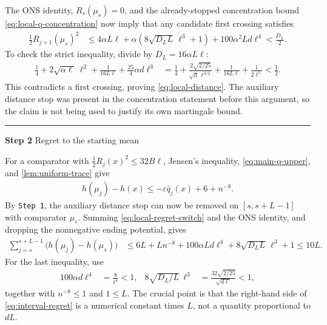 \documentclass{article}
\newcommand{\proofstep}[2]{%
    \par\medskip
    \noindent
    \textcolor{blue!55!black}{\rule{2pt}{1.2em}}%
    \hspace{0.6em}%
    {\sffamily\bfseries\color{blue!55!black}Step #1}%
    \quad
    {\sffamily #2}%
    \par\smallskip
}
\newcommand{\1}{\mathbf 1}
\newcommand{\eps}{\varepsilon}
\begin{document}
The ONS identity, $R_s(\mu_s)=0$, and the already-stopped concentration
bound \eqref{eq:local-q-concentration} now imply that any candidate first
crossing satisfies
\begin{align}
    \frac12R_{j+1}(\mu_s)^2
     & \leq4\alpha L\ell
    +\alpha\left(8\sqrt{D_LL}\,\ell^3+1\right)
    +100\alpha^2Ld\ell^4
    <\frac{D_L}{2}.
    \label{eq:local-distance-bootstrap}
\end{align}
To check the strict inequality, divide by $D_L=16\alpha L\ell$:
\begin{align}
    \frac14
    +2\sqrt{\alpha \ell}\,\ell^2
    +\frac{1}{16L\ell}
    +\frac{25}{4}\alpha d\ell^3
     & =\frac14
    +\frac{2\sqrt{2/25}}{\sqrt d\,\ell^{3/2}}
    +\frac{1}{16L\ell}
    +\frac{1}{2\ell^5}
    <\frac12.
\end{align}
This contradicts a first crossing, proving \eqref{eq:local-distance}.
The auxiliary distance stop was present in the concentration statement
before this argument, so the claim is not being used to justify its own
martingale bound.

\proofstep{2}{Regret to the starting mean}
For a comparator with $\frac12R_j(x)^2\leq32B\ell$, Jensen's inequality,
\eqref{eq:main-q-upper}, and \cref{lem:uniform-trace} give
\begin{align}
    h(\mu_j)-h(x)
    \leq-\eps \bar{q}_j(x)+6+n^{-8}.
    \label{eq:local-regret-switch}
\end{align}
By \texttt{Step 1}, the auxiliary distance stop can now be removed on
$[s,s+L-1]$ with comparator $\mu_s$. Summing
\eqref{eq:local-regret-switch} and the ONS identity, and dropping the
nonnegative ending potential, gives
\begin{align}
    \sum_{j=s}^{s+L-1}\bigl(h(\mu_j)-h(\mu_s)\bigr)
     & \leq6L+Ln^{-8}
    +100\alpha Ld\ell^4
    +8\sqrt{D_LL}\,\ell^3+1
    \leq10L.
    \label{eq:interval-regret}
\end{align}
For the last inequality, use
\begin{align}
    100\alpha d\ell^4 & =\frac8{\ell^4}<1,
                      & 8\sqrt{D_L/L}\,\ell^3
                      & =\frac{32\sqrt{2/25}}{\sqrt{d\ell}}<1,
    \label{eq:local-parameter-checks}
\end{align}
together with $n^{-8}\leq1$ and $1\leq L$.
The crucial point is that the right-hand side of
\eqref{eq:interval-regret} is a numerical constant times $L$, not a
quantity proportional to $dL$.
\end{document}
